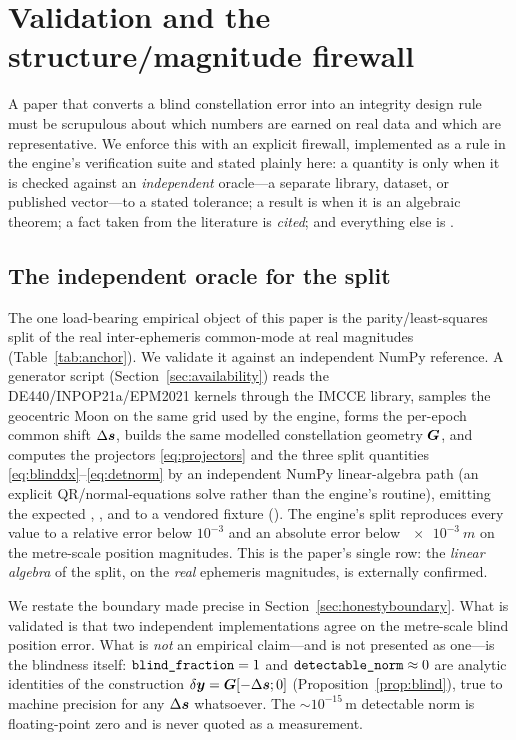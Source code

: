 \section{Validation and the structure/magnitude firewall}
\label{sec:validation}

A paper that converts a blind constellation error into an integrity design rule must be
scrupulous about which numbers are earned on real data and which are representative. We
enforce this with an explicit firewall, implemented as a rule in the engine's
verification suite and stated plainly here: a quantity is \Validated{} only when it is
checked against an \emph{independent} oracle---a separate library, dataset, or published
vector---to a stated tolerance; a result is \Proven{} when it is an algebraic theorem;
a fact taken from the literature is \emph{cited}; and everything else is \Modelled{}.

\subsection{The independent oracle for the split}
\label{sec:oracle}

The one load-bearing empirical object of this paper is the parity/least-squares split of
the real inter-ephemeris common-mode at real magnitudes (Table~\ref{tab:anchor}). We
validate it against an independent NumPy reference. A generator script
(Section~\ref{sec:availability}) reads the DE440/INPOP21a/EPM2021 kernels through the
IMCCE  library, samples the geocentric Moon on the same grid used by the
engine, forms the per-epoch common shift $\Delta\bm{s}$, builds the same modelled constellation
geometry $\bm{G}$, and computes the projectors \eqref{eq:projectors} and the three split
quantities \eqref{eq:blinddx}--\eqref{eq:detnorm} by an independent NumPy linear-algebra
path (an explicit QR/normal-equations solve rather than the engine's routine), emitting
the expected , , and  to a
vendored fixture (). The engine's split reproduces every value to a
relative error below $10^{-3}$ and an absolute error below $\SI{e-3}{m}$ on the
metre-scale position magnitudes. This is the paper's single \Validated{} row: the
\emph{linear algebra} of the split, on the \emph{real} ephemeris magnitudes, is
externally confirmed.

We restate the boundary made precise in Section~\ref{sec:honestyboundary}. What is
validated is that two independent implementations agree on the metre-scale blind
position error. What is \emph{not} an empirical claim---and is not presented as one---is
the blindness itself: $\texttt{blind\_fraction}=1$ and $\texttt{detectable\_norm}\approx0$
are analytic identities of the construction $\delta\bm{y}=\bm{G}[-\Delta\bm{s};0]$
(Proposition~\ref{prop:blind}), true to machine precision for any $\Delta\bm{s}$ whatsoever. The
$\sim\!10^{-15}\,$m detectable norm is floating-point zero and is never quoted as a
measurement.

